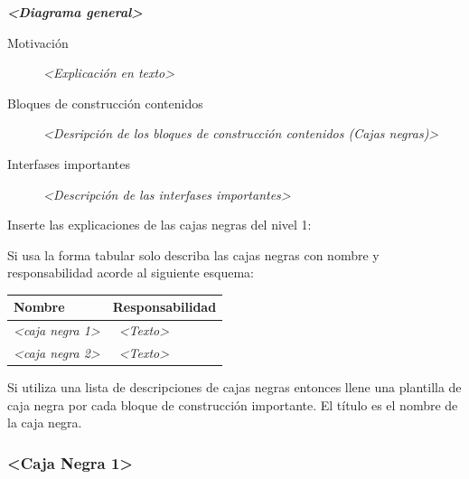 \documentclass[]{article}
\begin{document}
\emph{\textbf{\textless{}Diagrama general\textgreater{}}}

\begin{description}
\item[Motivación]
\emph{\textless{}Explicación en texto\textgreater{}}
\item[Bloques de construcción contenidos]
\emph{\textless{}Desripción de los bloques de construcción contenidos
(Cajas negras)\textgreater{}}
\item[Interfases importantes]
\emph{\textless{}Descripción de las interfases
importantes\textgreater{}}
\end{description}

Inserte las explicaciones de las cajas negras del nivel 1:

Si usa la forma tabular solo describa las cajas negras con nombre y
responsabilidad acorde al siguiente esquema:

\begin{longtable}[]{@{}ll@{}}
\toprule
\begin{minipage}[b]{0.31\columnwidth}\raggedright
\textbf{Nombre}\strut
\end{minipage} & \begin{minipage}[b]{0.63\columnwidth}\raggedright
\textbf{Responsabilidad}\strut
\end{minipage}\tabularnewline
\midrule
\endhead
\begin{minipage}[t]{0.31\columnwidth}\raggedright
\emph{\textless{}caja negra 1\textgreater{}}\strut
\end{minipage} & \begin{minipage}[t]{0.63\columnwidth}\raggedright
~\emph{\textless{}Texto\textgreater{}}\strut
\end{minipage}\tabularnewline
\begin{minipage}[t]{0.31\columnwidth}\raggedright
\emph{\textless{}caja negra 2\textgreater{}}\strut
\end{minipage} & \begin{minipage}[t]{0.63\columnwidth}\raggedright
~\emph{\textless{}Texto\textgreater{}}\strut
\end{minipage}\tabularnewline
\bottomrule
\end{longtable}

Si utiliza una lista de descripciones de cajas negras entonces llene una
plantilla de caja negra por cada bloque de construcción importante. El
título es el nombre de la caja negra.

\hypertarget{__caja_negra_1}{%
\subsubsection{\textless{}Caja Negra
1\textgreater{}}\label{__caja_negra_1}}
\end{document}

